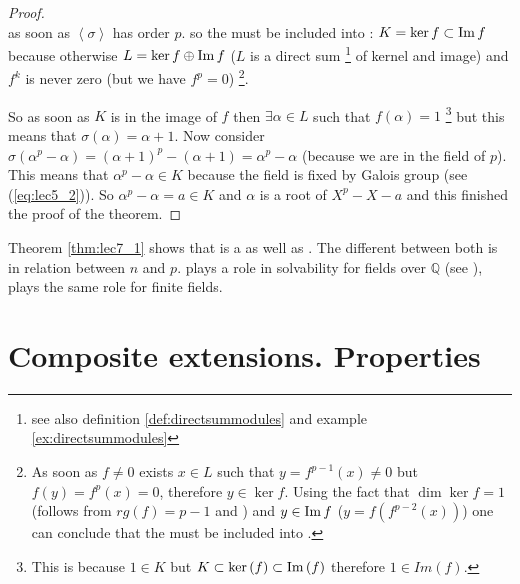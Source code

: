 \begin{theorem}
\begin{proof}
{\[      \]
      as soon as $\left<\sigma\right>$ has order $p$.      
    }
    so the  must
    be included into :
    $K = \ker f \subset \operatorname{Im} f$
    because otherwise $L = \ker f \oplus \operatorname{Im} f$ ($L$ is a
    direct sum
    \footnote{
      see also definition \ref{def:directsummodules} and example
      \ref{ex:directsummodules} 
    }
    of 
    kernel and image) and $f^k$ is never zero (but we have $f^p = 0$)
    \footnote{
      As soon as $f \ne 0$ exists $x \in L$ such that
      $y = f^{p-1}\left(x\right) \ne 0$ but
      $f\left(y\right) = f^p\left(x\right) = 0$,
      therefore $y \in \ker f$. Using the fact that $\dim{\ker f} = 1$
      (follows from $rg(f) = p - 1$ and ) and
      $y \in \operatorname{Im} f$ ($y = f\left(f^{p-2}\left(x\right)\right)$) one
      can conclude that  the  must
      be included into .
    }.

    So as soon as $K$ is in the image of $f$ then $\exists \alpha \in L$
    such that $f\left(\alpha\right) = 1$
    \footnote{
      This is because $1 \in K$ but
      $K \subset \ker\left(f\right) \subset \operatorname{Im}\left(f\right)$ therefore
      $1 \in Im\left(f\right)$.
    }
    but this means that
    $\sigma\left(\alpha\right) = \alpha + 1$. Now consider
    $\sigma\left(\alpha^p - \alpha\right) =
    \left(\alpha + 1\right)^p - \left(\alpha + 1\right) = \alpha^p -
    \alpha$ (because we are in the field of
     $p$). This 
    means that $\alpha^p - \alpha \in K$ because the field is fixed by
    Galois group (see (\ref{eq:lec5_2})). So
    $\alpha^p - \alpha =  a \in K$ and $\alpha$ is a root of $X^p - X
    - a$ and this finished the proof of the theorem.
  \end{proof}
\end{theorem}


\begin{myremark}
  Theorem \ref{thm:lec7_1} shows that
   is a
   as well as
  . The different between both is in
  relation  between $n$ and $p$.  
  plays a role in solvability for fields over
  $\mathbb{Q}$ (see ),
   plays the same 
  role for finite fields.
\end{myremark}

\section{Composite extensions. Properties}

